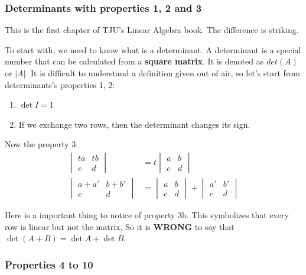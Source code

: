 \documentclass[12pt]{ctexart}
\begin{document}
\subsubsection{\textbf{Determinants with properties 1, 2 and 3}}

This is the first chapter of TJU's Linear Algebra book. The difference is striking.

To start with, we need to know what is a determinant. A determinant is a special number
that can be calculated from a \textbf{square matrix}. It is denoted as $det(A)$ or
$|A|$. It is difficult to understand a definition given out of air, so let's start from
determinants's properties 1, 2:
\begin{enumerate}[(1)]
  \item $\det I = 1$
  \item If we exchange two rows, then the determinant changes its sign.
\end{enumerate}

Now the property 3:
\begin{align*}
  \begin{vmatrix}
    ta & tb \\
    c & d
  \end{vmatrix} &=
  t \begin{vmatrix}
    a & b \\
    c & d
  \end{vmatrix} \tag{3a}\\
  \begin{vmatrix}
    a + a' & b + b' \\
    c & d
  \end{vmatrix} &=
  \begin{vmatrix}
    a & b \\
    c & d
  \end{vmatrix}
  +
  \begin{vmatrix}
    a' & b' \\
    c & d
  \end{vmatrix} \tag{3b}
\end{align*}

Here is a important thing to notice of property 3b. This symbolizes that every row
is linear but not the matrix. So it is \textbf{WRONG} to say that $\det(A + B) =
\det A + \det B$.

\subsubsection{\textbf{Properties 4 to 10}}
\end{document}
